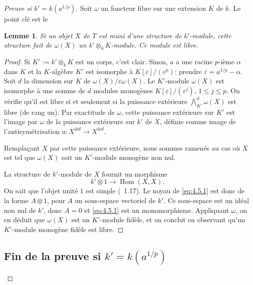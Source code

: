 \documentclass[11pt,a4paper]{article}
\theoremstyle{plain}
\newtheorem{lemma}[theorem]{Lemme}
\theoremstyle{definition}
\DeclareMathOperator{\Hom}{Hom}
\begin{document}
\begin{proof}[Preuve si $k' = k(a^{1/p})$]
Soit $\omega$ un foncteur fibre sur une extension $K$ de $k$. Le point cl\'e est le

\begin{lemma}\label{lem:4.5}
Si un objet $X$ de $T$ est muni d'une structure de $k'$-module, cette structure fait de $\omega(X)$ un $k' \otimes_k K$-module. Ce module est libre.
\end{lemma}

\begin{proof}
Si $K' := k' \otimes_k K$ est un corps, c'est clair. Sinon, $a$ a une racine $p$-i\`eme $\alpha$ dans $K$ et la $K$-alg\`ebre $K'$ est isomorphe \`a $K[\varepsilon]/(\varepsilon^p)$: prendre $\varepsilon = a^{1/p} - \alpha$. Soit $d$ la dimension sur $K$ de $\omega(X)/\varepsilon\omega(X)$. Le $K'$-module $\omega(X)$ est isomorphe \`a une somme de $d$ modules monog\`enes $K[\varepsilon]/(\varepsilon^j)$, $1 \leq j \leq p$. On v\'erifie qu'il est libre si et seulement si la puissance ext\'erieure $\bigwedge^d_{K'} \omega(X)$ est libre (de rang un). Par exactitude de $\omega$, cette puissance ext\'erieure sur $K'$ est l'image par $\omega$ de la puissance ext\'erieure sur $k'$ de $X$, d\'efinie comme image de l'antisym\'etrisation $a: X^{\otimes d} \to X^{\otimes d}$.

Rempla\c{c}ant $X$ par cette puissance ext\'erieure, nous sommes ramen\'es au cas o\`u $X$ est tel que $\omega(X)$ soit un $K'$-module monog\`ene non nul.

La structure de $k'$-module de $X$ fournit un morphisme
\begin{equation}\label{eq:4.5.1}
k' \otimes 1 \longrightarrow \Hom(X, X).
\end{equation}
On sait que l'objet unit\'e $1$ est simple (\cite{DM}~1.17). Le noyau de \eqref{eq:4.5.1} est donc de la forme $A \otimes 1$, pour $A$ un sous-espace vectoriel de $k'$. Ce sous-espace est un id\'eal non nul de $k'$, donc $A = 0$ et \eqref{eq:4.5.1} est un monomorphisme. Appliquant $\omega$, on en d\'eduit que $\omega(X)$ est un $K'$-module fid\`ele, et on conclut en observant qu'un $K'$-module monog\`ene fid\`ele est libre.
\end{proof}

\subsection{Fin de la preuve si $k' = k(a^{1/p})$}\label{sec:4.6}


\end{proof}
\end{document}
